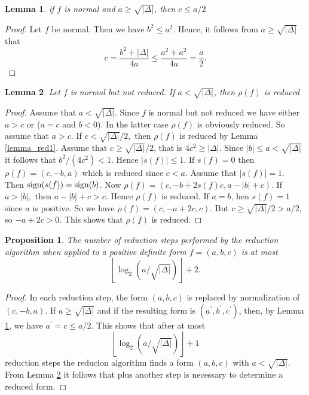 \documentclass[12pt, letterpaper]{report}
\newtheorem{lemma}{Lemma}
\newtheorem{proposition}{Proposition}
\begin{document}
\begin{lemma}
if $f$ is normal and $a \ge \sqrt{|\Delta|}$, then $c \le a/2$
\label{lemma_red2}
\end{lemma}
\begin{proof}
Let $f$ be normal. Then we have $b^2 \le a^2$. Hence, it follows from $a\ge \sqrt{|\Delta|}$ that
$$
c = \frac{b^2 + |\Delta|}{4a} \le \frac{a^2 + a^2}{4a} = \frac{a}{2}.
$$
\end{proof}

\begin{lemma}
Let $f$ is normal but not reduced. If $a < \sqrt{|\Delta|}$, then $\rho(f)$ is reduced
\label{lemma_red3}
\end{lemma}
\begin{proof}
Assume that $a < \sqrt{|\Delta|}$. Since $f$ is normal but not reduced we have either $a > c$ or ($a = c$ and $b < 0$). In the latter 
case $\rho(f)$ is obviously reduced. So assume that $a > c$. If $c < \sqrt{|\Delta|}/2,$ then $\rho(f)$ is reduced by Lemma \ref{lemma_red1}.
Assume that $c\ge \sqrt{|\Delta|}/2$, that is $4c^2\ge |\Delta|$. Since $|b|\le a < \sqrt{|\Delta|}$ it follows that $b^2/(4c^2) < 1$.
Hence  $|s(f)|\le 1$. If $s(f) =0$ then $\rho(f) = (c, -b,a)$ which is reduced since $c < a$. Assume that $|s(f)| = 1$. Then 
${\rm sign}(s(f)) = {\rm sign}(b)$. Now $\rho(f) = (c, -b + 2s(f)c, a - |b| + c).$ If $ a > |b|,$ then $a -|b| + c > c$. Hence 
$\rho(f)$ is reduced. If $a=b$, hen $s(f) = 1$ since $a$ is positive. So we have $\rho(f) = (c, -a + 2c, c)$. But $c \ge \sqrt{|\Delta|}/2 > a/2$,
so $-a + 2c > 0$. This shows that $\rho(f)$ is reduced.
\end{proof}
\begin{proposition}
The number of reduction steps performed by the reduction algorithm
when applied to a positive definite form $f = (a, b, c)$ is at most
$$
\left\lfloor\log_2(a/\sqrt{|\Delta|})\right\rfloor + 2.
$$
\end{proposition}
\begin{proof}
In each reduction step, the form $(a,b,c)$ is replaced by normalization of $(c, -b, a)$. If $a\ge \sqrt{|\Delta|}$ and if 
the resulting form is $(a^{\prime}, b^{\prime}, c^{\prime})$, then, by Lemma \ref{lemma_red2}, we have $a^{\prime} = c \le a/2$. This shows
that after at most 
$$
\left\lfloor\log_2(a/\sqrt{|\Delta|})\right\rfloor + 1
$$
reduction steps the reducion algorithm finds a form $(a,b,c)$ with
$a < \sqrt{|\Delta|}.$ From Lemma \ref{lemma_red3} it follows that plus another step is necessary to determine a reduced form.
\end{proof}
\end{document}
